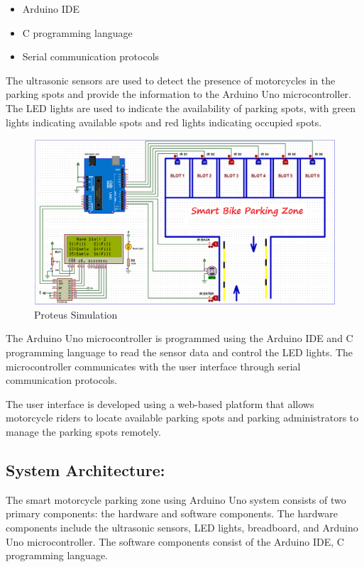 \documentclass[conference]{IEEEtran}
\begin{document}
	\begin{itemize}
		\item Arduino IDE
		\item C programming language
		\item Serial communication protocols
	\end{itemize}


The ultrasonic sensors are used to detect the presence of motorcycles in the parking spots and provide the information to the Arduino Uno microcontroller. The LED lights are used to indicate the availability of parking spots, with green lights indicating available spots and red lights indicating occupied spots.
\begin{figure}[htbp]
	\centerline{\includegraphics[scale=0.25]{Proteus Simulation.png}}
	\caption{Proteus Simulation}
	\label{fig}
\end{figure}

The Arduino Uno microcontroller is programmed using the Arduino IDE and C programming language to read the sensor data and control the LED lights. The microcontroller communicates with the user interface through serial communication protocols.

The user interface is developed using a web-based platform that allows motorcycle riders to locate available parking spots and parking administrators to manage the parking spots remotely.
	\subsection{System Architecture:}
	The smart motorcycle parking zone using Arduino Uno system consists of two primary components: the hardware and software components. The hardware components include the ultrasonic sensors, LED lights, breadboard, and Arduino Uno microcontroller. The software components consist of the Arduino IDE, C programming language.
	
\end{document}
